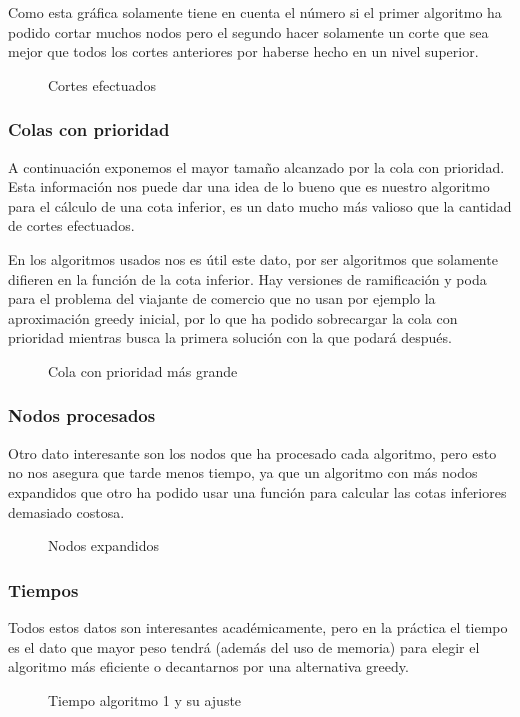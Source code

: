 Como esta gráfica solamente tiene en cuenta el número si el primer algoritmo ha podido 
cortar muchos nodos pero el segundo hacer solamente un corte que sea mejor que todos los cortes
anteriores por haberse hecho en un nivel superior.
 
\begin{figure}[H]
    \centering
    \caption{Cortes efectuados}
\end{figure}


\subsubsection{Colas con prioridad}
A continuación exponemos el mayor tamaño alcanzado por la cola con prioridad.
Esta información nos puede dar una idea de lo bueno que es nuestro algoritmo para el cálculo
de una cota inferior, es un dato mucho más valioso que la cantidad de cortes efectuados.

En los algoritmos usados nos es útil este dato, por ser algoritmos que solamente difieren en
la función de la cota inferior. Hay versiones de ramificación y poda para el problema del viajante
de comercio que no usan por ejemplo la aproximación greedy inicial, por lo que ha podido 
sobrecargar la cola con prioridad mientras busca la primera solución con la que podará después.

\begin{figure}[H]
    \centering
    \caption{Cola con prioridad más grande}
\end{figure}


\subsubsection{Nodos procesados}
Otro dato interesante son los nodos que ha procesado cada algoritmo, pero esto no nos asegura
que tarde menos tiempo, ya que un algoritmo con más nodos expandidos que otro ha podido usar una
función para calcular las cotas inferiores demasiado costosa.
\begin{figure}[H]
    \centering
    \caption{Nodos expandidos}
\end{figure}



\subsubsection{Tiempos}
Todos estos datos son interesantes académicamente, pero en la práctica el tiempo es el dato
que mayor peso tendrá (además del uso de memoria) para elegir el algoritmo más eficiente o 
decantarnos por una alternativa greedy.
\begin{figure}[H]
    \centering
    \caption{Tiempo algoritmo 1 y su ajuste}
\end{figure}


